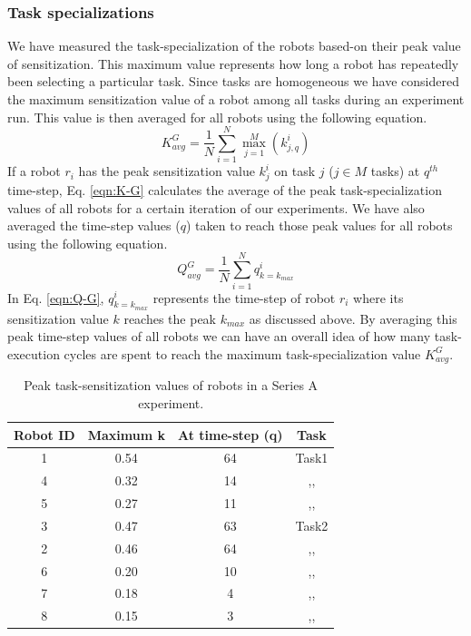 \documentclass[smallcondensed]{svjour3}
\begin{document}
\subsubsection{Task specializations}
We have measured the task-specialization of the robots based-on their peak value of sensitization. This maximum value represents how long a robot has repeatedly been selecting a particular task. Since tasks are homogeneous we have considered the maximum sensitization value of a robot among all tasks during an experiment run. This value is then averaged for all robots using the following  equation. 
\begin{equation}
K^G_{avg} = \frac{1}{N}\sum_{i=1}^{N} \max_{j=1}^M\left ( k^i_{j, q} \right ) 
\label{eqn:K-G}
\end{equation}
If a robot $r_i$ has the peak sensitization value $k^i_j$ on task $j$ ($j \in M$ tasks)  at $q^{th}$ time-step, Eq. \ref{eqn:K-G} calculates the average of the peak task-specialization values of all robots for a certain iteration of our experiments. We have also averaged the time-step values ($q$) taken to reach those peak values for all robots using the following equation.
\begin{equation}
Q^G_{avg}= \frac{1}{N}\sum_{i=1}^{N} q^i_{k=k_{max}}
\label{eqn:Q-G}
\end{equation}
In Eq. \ref{eqn:Q-G}, $q^i_{k=k_{max}}$ represents the time-step of robot $r_i$  where its sensitization value $k$ reaches the peak $k_{max}$ as discussed above. By averaging this peak time-step values of all robots we can have an overall idea of how many task-execution cycles are spent to reach the maximum task-specialization value $K^G_{avg}$.
\begin{table}
\centering
\caption{Peak task-sensitization values of robots in a Series A experiment.}
\begin{tabular}{|c|c|c|c|}
\hline \textbf{Robot ID} & \textbf{Maximum k} & \textbf{At time-step (q)} & \textbf{Task} \\ 
\hline 1 & 0.54 & 64 & Task1\\
\hline 4 & 0.32 & 14 & ,,\\
\hline 5 & 0.27 & 11 & ,,\\
\hline 3 & 0.47 & 63 & Task2\\
\hline 2 & 0.46 & 64 & ,,\\
\hline 6 & 0.20 & 10 & ,,\\
\hline 7 & 0.18 & 4 & ,,\\
\hline 8 & 0.15 & 3 & ,,\\
\hline 
\end{tabular} 
\label{table:K-G-SA}
\end{table}
\end{document}
